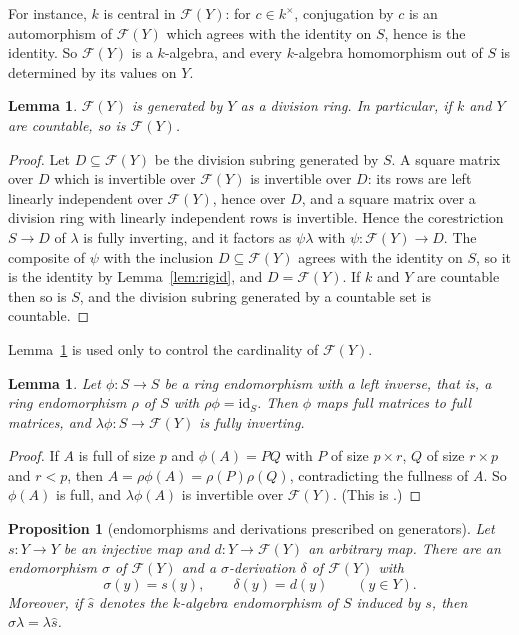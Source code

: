 \documentclass[11pt]{amsart}
\theoremstyle{plain}
\newtheorem{proposition}[theorem]{Proposition}
\newtheorem{lemma}[theorem]{Lemma}
\theoremstyle{definition}
\theoremstyle{remark}
\newcommand{\ff}[1]{\mathcal F(#1)}
\newcommand{\id}{\mathrm{id}}
\begin{document}
For instance, $k$ is central in $\ff Y$: for $c\in k^\times$, conjugation by $c$ is an automorphism of $\ff Y$ which agrees with the identity on $S$, hence is the identity. So $\ff Y$ is a $k$-algebra, and every $k$-algebra homomorphism out of $S$ is determined by its values on $Y$.

\begin{lemma}\label{lem:generated}
$\ff Y$ is generated by $Y$ as a division ring. In particular, if $k$ and $Y$ are countable, so is $\ff Y$.
\end{lemma}

\begin{proof}
Let $D\subseteq\ff Y$ be the division subring generated by $S$. A square matrix over $D$ which is invertible over $\ff Y$ is invertible over $D$: its rows are left linearly independent over $\ff Y$, hence over $D$, and a square matrix over a division ring with linearly independent rows is invertible. Hence the corestriction $S\to D$ of $\lambda$ is fully inverting, and it factors as $\psi\lambda$ with $\psi\colon\ff Y\to D$. The composite of $\psi$ with the inclusion $D\subseteq\ff Y$ agrees with the identity on $S$, so it is the identity by Lemma~\ref{lem:rigid}, and $D=\ff Y$. If $k$ and $Y$ are countable then so is $S$, and the division subring generated by a countable set is countable.
\end{proof}

Lemma~\ref{lem:generated} is used only to control the cardinality of $\ff Y$.

\begin{lemma}\label{lem:honest}
Let $\phi\colon S\to S$ be a ring endomorphism with a left inverse, that is, a ring endomorphism $\rho$ of $S$ with $\rho\phi=\id_S$. Then $\phi$ maps full matrices to full matrices, and $\lambda\phi\colon S\to\ff Y$ is fully inverting.
\end{lemma}

\begin{proof}
If $A$ is full of size $p$ and $\phi(A)=PQ$ with $P$ of size $p\times r$, $Q$ of size $r\times p$ and $r<p$, then $A=\rho\phi(A)=\rho(P)\rho(Q)$, contradicting the fullness of $A$. So $\phi(A)$ is full, and $\lambda\phi(A)$ is invertible over $\ff Y$. (This is \cite[Proposition~4.5.1]{CohSF}.)
\end{proof}

\begin{proposition}[endomorphisms and derivations prescribed on generators]\label{prop:extend}
Let $s\colon Y\to Y$ be an injective map and $d\colon Y\to\ff Y$ an arbitrary map. There are an endomorphism $\sigma$ of $\ff Y$ and a $\sigma$-derivation $\delta$ of $\ff Y$ with
\[
\sigma(y)=s(y),\qquad\delta(y)=d(y)\qquad(y\in Y).
\]
Moreover, if $\hat s$ denotes the $k$-algebra endomorphism of $S$ induced by $s$, then $\sigma\lambda=\lambda\hat s$.
\end{proposition}
\end{document}
